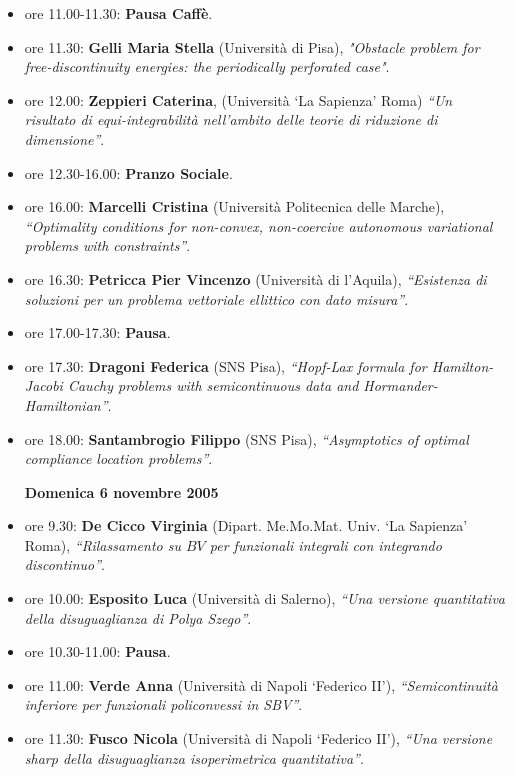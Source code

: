 \documentclass[12pt]{article}
\begin{document}
\begin{itemize}
\item{ore 11.00-11.30: {\bf Pausa Caff\`e}.}

\item{ore 11.30: {\bf Gelli Maria Stella} (Universit\`a di Pisa),}
\emph{"Obstacle problem for free-discontinuity energies:
the periodically perforated case"}.

\item{ore 12.00: {\bf Zeppieri Caterina}, (Universit\`a `La Sapienza' Roma)}
\emph{``Un risultato di equi-integrabilit\`a nell'ambito delle 
teorie di riduzione di dimensione''}.


\item{ore 12.30-16.00: {\bf Pranzo Sociale}.} 


\item{ore 16.00: {\bf Marcelli Cristina} 
(Universit\`a Politecnica delle Marche),}
\emph{``Optimality conditions for non-convex, non-coercive
autonomous variational problems with constraints''}.


\item{ore 16.30: {\bf Petricca Pier Vincenzo} (Universit\`a di l'Aquila),}
\emph{ ``Esistenza di so\-lu\-zioni per un problema vettoriale ellittico 
con dato misura''}.


\item{ore 17.00-17.30: {\bf Pausa}.} 

\item{ore 17.30: {\bf Dragoni Federica} (SNS Pisa),} 
\emph{``Hopf-Lax formula for Hamilton-Jacobi Cauchy problems with
semicontinuous data and Hormander-Hamiltonian''}.

\item{ore 18.00: {\bf Santambrogio Filippo} (SNS Pisa),}
\emph{``Asymptotics of optimal complian\-ce location problems''}.


\vspace*{0.2truein}


\centerline{\bf Domenica 6 novembre 2005}

\item{ore 9.30: {\bf De Cicco Virginia} 
(Dipart. Me.Mo.Mat. Univ. `La Sapienza' Roma),}
\emph{``Rilassamento su $BV$ per funzionali integrali con integrando 
discontinuo''}.

\item{ore 10.00: {\bf Esposito Luca} (Universit\`a di Salerno),}
\emph{``Una versione quantitativa della disuguaglianza di Polya Szego''}.

\item{ore 10.30-11.00: {\bf Pausa}.}

\item{ore 11.00: {\bf Verde Anna} (Universit\`a di Napoli `Federico II'),} 
\emph{``Semicontinuit\`a inferiore per funzionali policonvessi in SBV''}.

\item{ore 11.30: {\bf Fusco Nicola} (Universit\`a di Napoli `Federico II'),}
\emph{``Una versione sharp della disuguaglianza isoperimetrica quantitativa''}.







 

\end{itemize}
\end{document}
